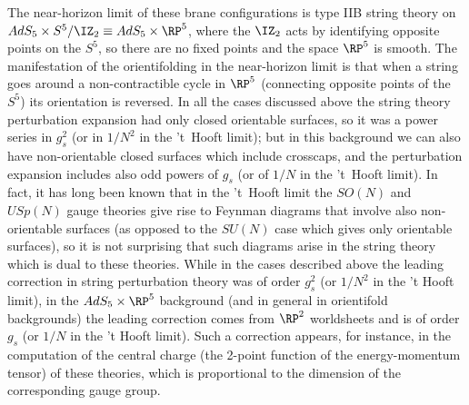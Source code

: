 The near-horizon limit of these brane configurations is type IIB
string theory on $AdS_5\times S^5/\IZ_2 \equiv AdS_5\times \RP^5$, where
the $\IZ_2$ acts by identifying opposite points on the $S^5$, so there
are no fixed points and the space $\RP^5$ is smooth. The manifestation
of the orientifolding in the near-horizon limit is that when a string
goes around a non-contractible cycle in $\RP^5$ (connecting opposite
points of the $S^5$) its orientation is reversed. In all the cases
discussed above the string theory perturbation expansion had only
closed orientable surfaces, so it was a power series in $g_s^2$ (or in
$1/N^2$ in the 't~Hooft limit); but in this background we can also
have non-orientable closed surfaces which include crosscaps, and the
perturbation expansion includes also odd powers of $g_s$ (or of $1/N$
in the 't~Hooft limit). In fact, it has long been known
\cite{Cicuta:1982fu} that in the 't~Hooft limit the $SO(N)$ and
$USp(N)$ gauge theories give rise to Feynman diagrams that involve
also non-orientable surfaces (as opposed to the $SU(N)$ case which
gives only orientable surfaces), so it is not surprising that such
diagrams arise in the string theory which is dual to these
theories. While in the cases described above the leading correction in
string perturbation theory was of order $g_s^2$ (or $1/N^2$ in the 't
Hooft limit), in the $AdS_5\times \RP^5$ background (and in general in
orientifold backgrounds) the leading correction comes from $\RP^2$
worldsheets and is of order $g_s$ (or $1/N$ in the 't Hooft
limit). Such a correction appears, for instance, in the computation of
the central charge (the 2-point function of the energy-momentum tensor) of
these theories, which is proportional to the dimension of the
corresponding gauge group.

